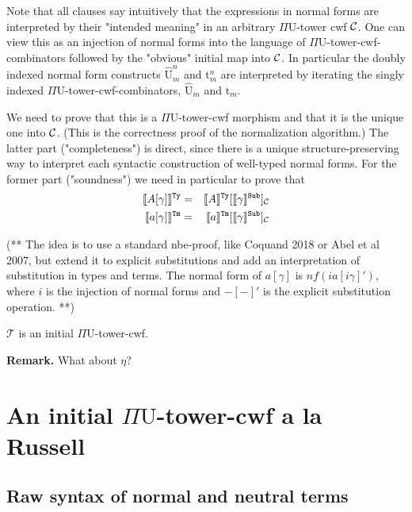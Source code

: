 \documentclass{lmcs}
\def\UU{\mathrm{U}}
\def\UUhat{\hat{\UU}}
\def\t{\mathrm{t}}
\def\Tm{\mathrm{Tm}}
\def\T{\mathcal{T}}
\newcommand{\intCtxU}[1]{\llbracket #1 \rrbracket^\RawCtx}
\newcommand{\intSubU}[1]{\llbracket #1 \rrbracket^\RawSub}
\newcommand{\intTyU}[1]{\llbracket #1 \rrbracket^\RawTy}
\newcommand{\intTmU}[1]{\llbracket #1 \rrbracket^\RawTm}
\begin{document}
Note that all clauses say intuitively that the expressions in normal forms are interpreted by their "intended meaning" in an arbitrary $\Pi\UU$-tower cwf ${\mathcal C}$. One can view this as an injection of normal forms into the language of $\Pi\UU$-tower-cwf-combinators followed by the "obvious" initial map into ${\mathcal C}$. In particular the doubly indexed normal form constructs $\UUhat^n_m$ and $\t^n_m$ are interpreted by iterating the singly indexed $\Pi\UU$-tower-cwf-combinators, $\UUhat_m$ and $\t_m$.

We need to prove that this is a $\Pi\UU$-tower-cwf morphism and that it is the unique one into ${\mathcal C}$. (This is the correctness proof of the normalization algorithm.) The latter part ("completeness") is direct, since there is a unique structure-preserving way to interpret each syntactic construction of well-typed normal forms. For the former part ("soundness") we need in particular to prove that
\begin{eqnarray*}
\intTyU{A[\gamma]} &=& \intTyU{A}[\intSubU{\gamma}]_\C\\
\intTmU{a[\gamma]} &=& \intTmU{a}[\intSubU{\gamma}]_\C
\end{eqnarray*}

(** The idea is to use a standard nbe-proof, like Coquand 2018 or Abel et al 2007, but extend it to explicit substitutions and add an interpretation of substitution in types and terms. The normal form of $a [ \gamma ]$ is $nf (i a [ i \gamma ]')$, where $i$ is the injection of normal forms and $-[-]'$ is the explicit substitution operation. **)

\begin{thm}\label{theom:initial_cwf}
  $\T$ is an initial $\Pi\UU$-tower-cwf.
\end{thm}

{\bf Remark.} What about $\eta$?

\section{An initial $\Pi\UU$-tower-cwf a la  Russell}

\subsection{Raw syntax of normal and neutral terms}
\end{document}
